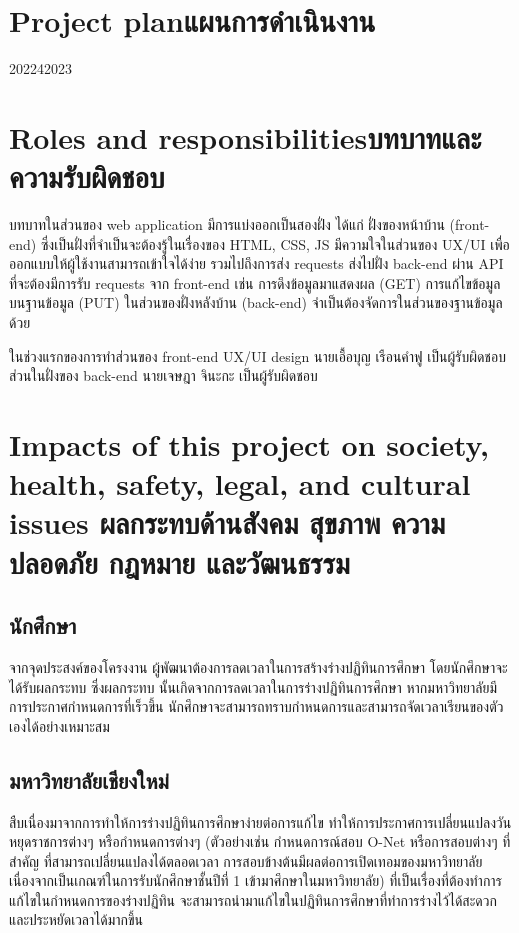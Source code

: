 \pagebreak
\section{\ifenglish Project plan\else แผนการดำเนินงาน\fi}
\begin{plan}{1}{2022}{4}{2023}
\end{plan}

\section{\ifenglish Roles and responsibilities\else บทบาทและความรับผิดชอบ\fi}
บทบาทในส่วนของ web application มีการแบ่งออกเป็นสองฝั่ง ได้แก่ 
%
ฝั่งของหน้าบ้าน (front-end) ซึ่งเป็นฝั่งที่จำเป็นจะต้องรู้ในเรื่องของ HTML, CSS, JS มีความใจในส่วนของ UX/UI เพื่อออกแบบให้ผู้ใช้งานสามารถเข้าใจได้ง่าย 
%
รวมไปถึงการส่ง requests ส่งไปฝั่ง back-end ผ่าน API ที่จะต้องมีการรับ requests จาก front-end เช่น การดึงข้อมูลมาแสดงผล (GET) การแก้ไขข้อมูลบนฐานข้อมูล (PUT)  
ในส่วนของฝั่งหลังบ้าน (back-end) จำเป็นต้องจัดการในส่วนของฐานข้อมูลด้วย
%


ในช่วงแรกของการทำส่วนของ front-end UX/UI design นายเอื้อบุญ เรือนคำฟู เป็นผู้รับผิดชอบ  
%
ส่วนในฝั่งของ back-end นายเจษฎา จินะกะ เป็นผู้รับผิดชอบ

\section{\ifenglish%
Impacts of this project on society, health, safety, legal, and cultural issues
\else%
ผลกระทบด้านสังคม สุขภาพ ความปลอดภัย กฎหมาย และวัฒนธรรม
\fi}

\subsection{นักศึกษา}
    จากจุดประสงค์ของโครงงาน ผู้พัฒนาต้องการลดเวลาในการสร้างร่างปฏิทินการศึกษา โดยนักศึกษาจะได้รับผลกระทบ ซึ่งผลกระทบ
%
นั้นเกิดจากการลดเวลาในการร่างปฏิทินการศึกษา หากมหาวิทยาลัยมีการประกาศกำหนดการที่เร็วขึ้น นักศึกษาจะสามารถทราบกำหนดการและสามารถจัดเวลาเรียนของตัวเองได้อย่างเหมาะสม 
%

\subsection{มหาวิทยาลัยเชียงใหม่}
สืบเนื่องมาจากการทำให้การร่างปฏิทินการศึกษาง่ายต่อการแก้ไข ทำให้การประกาศการเปลี่ยนแปลงวันหยุดราชการต่างๆ หรือกำหนดการต่างๆ 
%
(ตัวอย่างเช่น กำหนดการณ์สอบ O-Net หรือการสอบต่างๆ ที่สำคัญ ที่สามารถเปลี่ยนแปลงได้ตลอดเวลา การสอบข้างต้นมีผลต่อการเปิดเทอมของมหาวิทยาลัย เนื่องจากเป็นเกณฑ์ในการรับนักศึกษาชั้นปีที่ 1 เข้ามาศึกษาในมหาวิทยาลัย) 
%
ที่เป็นเรื่องที่ต้องทำการแก้ไขในกำหนดการของร่างปฏิทิน จะสามารถนำมาแก้ไขในปฏิทินการศึกษาที่ทำการร่างไว้ได้สะดวกและประหยัดเวลาได้มากขึ้น


